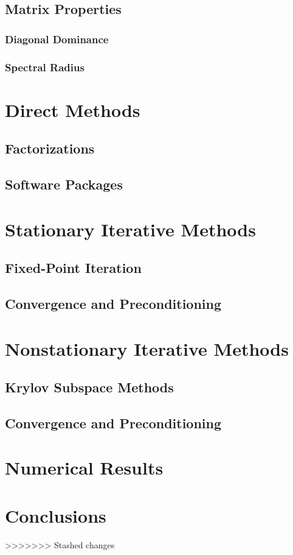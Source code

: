 \documentclass[10pt]{article}
\begin{document}
\begin{multicols}{2}
\subsection{Matrix Properties}
\subsubsection{Diagonal Dominance}
\subsubsection{Spectral Radius}

\section{Direct Methods}
\subsection{Factorizations}
\subsection{Software Packages}

\section{Stationary Iterative Methods}
\subsection{Fixed-Point Iteration}
\subsection{Convergence and Preconditioning}

\section{Nonstationary Iterative Methods}
\subsection{Krylov Subspace Methods}
\subsection{Convergence and Preconditioning}

\section{Numerical Results}

\section{Conclusions}

\nocite{*}


\end{multicols}
>>>>>>> Stashed changes
\end{document}
